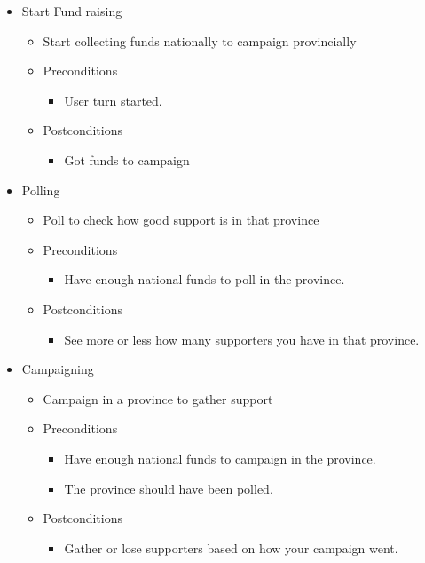 \documentclass{article}
\begin{document}
	\begin{itemize}
   		\item  Start Fund raising
			\begin{itemize}
				\item Start collecting funds nationally to campaign provincially 
				\item Preconditions
				\begin{itemize}
					\item User turn started.
				\end{itemize}
				\item Postconditions
				\begin{itemize}
					\item Got funds to campaign
				\end{itemize}
			\end{itemize}
	\end{itemize}
	
	\begin{itemize}
   		\item  Polling
			\begin{itemize}
				\item Poll to check how good support is in that province
				\item Preconditions
				\begin{itemize}
					\item Have enough national funds to poll in the province.
				\end{itemize}
				\item Postconditions
				\begin{itemize}
					\item See more or less how many supporters you have in that province.
				\end{itemize}
			\end{itemize}
	\end{itemize}
	
	\begin{itemize}
   		\item  Campaigning
			\begin{itemize}
				\item Campaign in a province to gather support
				\item Preconditions
				\begin{itemize}
					\item Have enough national funds to campaign in the province.
					\item The province should have been polled.
				\end{itemize}
				\item Postconditions
				\begin{itemize}
					\item Gather or lose supporters based on how your campaign went.
				\end{itemize}
			\end{itemize}
	\end{itemize}
	
\end{document}
